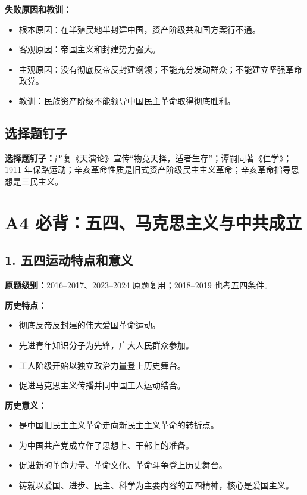 \documentclass[UTF8,zihao=-4]{ctexart}
\newcommand{\exam}[1]{\textcolor{accent}{\bfseries 原题级别：}#1}
\newcommand{\pin}[1]{\textcolor{main}{\bfseries 选择题钉子：}#1}
\begin{document}
\textbf{失败原因和教训：}
\begin{itemize}
  \item 根本原因：在半殖民地半封建中国，资产阶级共和国方案行不通。
  \item 客观原因：帝国主义和封建势力强大。
  \item 主观原因：没有彻底反帝反封建纲领；不能充分发动群众；不能建立坚强革命政党。
  \item 教训：民族资产阶级不能领导中国民主革命取得彻底胜利。
\end{itemize}

\subsection{选择题钉子}
\pin{严复《天演论》宣传“物竞天择，适者生存”；谭嗣同著《仁学》；1911 年保路运动；辛亥革命性质是旧式资产阶级民主主义革命；辛亥革命指导思想是三民主义。}

\newpage

\section{A4 必背：五四、马克思主义与中共成立}

\subsection{1. 五四运动特点和意义}
\exam{2016--2017、2023--2024 原题复用；2018--2019 也考五四条件。}

\textbf{历史特点：}
\begin{itemize}
  \item 彻底反帝反封建的伟大爱国革命运动。
  \item 先进青年知识分子为先锋，广大人民群众参加。
  \item 工人阶级开始以独立政治力量登上历史舞台。
  \item 促进马克思主义传播并同中国工人运动结合。
\end{itemize}

\textbf{历史意义：}
\begin{itemize}
  \item 是中国旧民主主义革命走向新民主主义革命的转折点。
  \item 为中国共产党成立作了思想上、干部上的准备。
  \item 促进新的革命力量、革命文化、革命斗争登上历史舞台。
  \item 铸就以爱国、进步、民主、科学为主要内容的五四精神，核心是爱国主义。
\end{itemize}
\end{document}
